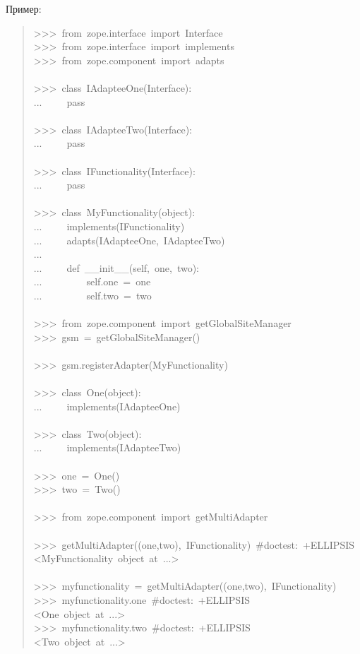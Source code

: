 \documentclass[14pt,a4paper,openany,twoside,final]{extbook}
\begin{document}
Пример:

\begin{quote}{\ttfamily \raggedright \noindent
>{}>{}>~from~zope.interface~import~Interface\\
>{}>{}>~from~zope.interface~import~implements\\
>{}>{}>~from~zope.component~import~adapts\\
~\\
>{}>{}>~class~IAdapteeOne(Interface):\\
...~~~~~pass\\
~\\
>{}>{}>~class~IAdapteeTwo(Interface):\\
...~~~~~pass\\
~\\
>{}>{}>~class~IFunctionality(Interface):\\
...~~~~~pass\\
~\\
>{}>{}>~class~MyFunctionality(object):\\
...~~~~~implements(IFunctionality)\\
...~~~~~adapts(IAdapteeOne,~IAdapteeTwo)\\
...\\
...~~~~~def~\_\_init\_\_(self,~one,~two):\\
...~~~~~~~~~self.one~=~one\\
...~~~~~~~~~self.two~=~two\\
~\\
>{}>{}>~from~zope.component~import~getGlobalSiteManager\\
>{}>{}>~gsm~=~getGlobalSiteManager()\\
~\\
>{}>{}>~gsm.registerAdapter(MyFunctionality)\\
~\\
>{}>{}>~class~One(object):\\
...~~~~~implements(IAdapteeOne)\\
~\\
>{}>{}>~class~Two(object):\\
...~~~~~implements(IAdapteeTwo)\\
~\\
>{}>{}>~one~=~One()\\
>{}>{}>~two~=~Two()\\
~\\
>{}>{}>~from~zope.component~import~getMultiAdapter\\
~\\
>{}>{}>~getMultiAdapter((one,two),~IFunctionality)~\#doctest:~+ELLIPSIS\\
<MyFunctionality~object~at~...>\\
~\\
>{}>{}>~myfunctionality~=~getMultiAdapter((one,two),~IFunctionality)\\
>{}>{}>~myfunctionality.one~\#doctest:~+ELLIPSIS\\
<One~object~at~...>\\
>{}>{}>~myfunctionality.two~\#doctest:~+ELLIPSIS\\
<Two~object~at~...>
}
\end{quote}
\end{document}
